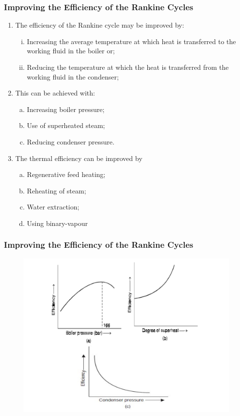 \documentclass[10pt,compress,handout,ignorenonframetext]{beamer}
\begin{document}
\begin{frame}
 \frametitle{Improving the Efficiency of the Rankine Cycles}
    \begin{enumerate}%
     \item <1-> The efficiency of the Rankine cycle may be improved by:
     \begin{enumerate}[(i)]%
      \item <2-> Increasing the average temperature at which heat is transferred to the working fluid in the boiler or;
      \item <3-> Reducing the temperature at which the heat is transferred from the working fluid in the condenser;
     \end{enumerate} 
     \item <4-> This can be achieved with:
      \begin{enumerate}[(a)]%
       \item <5-> Increasing boiler pressure;
       \item <6-> Use of superheated steam;
       \item <7-> Reducing condenser pressure.
      \end{enumerate}
     \item <8-> The thermal efficiency can be improved by
      \begin{enumerate}[(a)]%
       \item <9-> Regenerative feed heating;
       \item <10-> Reheating of steam;
       \item <11-> Water extraction;
       \item <12-> Using binary-vapour
      \end{enumerate}
    \end{enumerate}  
 \normalsize
\end{frame}



\begin{frame}
 \frametitle{Improving the Efficiency of the Rankine Cycles}
    \begin{figure}%
     \begin{center}
      \includegraphics[width=8.cm,clip]{./Pics/Rankine_Improving_Efficiency}
     \end{center}
    \end{figure}
 \normalsize
\end{frame}
\end{document}
